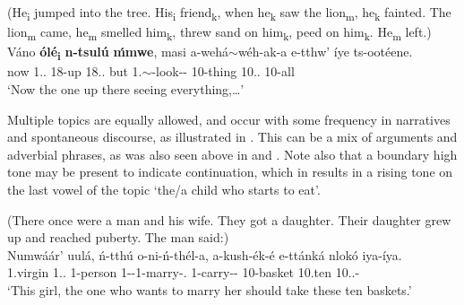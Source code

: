 \documentclass[output=paper]{langscibook}
\begin{document}
\z

\ea
\label{bkm:Ref129081312}
(He\textsubscript{i} jumped into the tree. His\textsubscript{i} friend\textsubscript{k}, when he\textsubscript{k} saw the lion\textsubscript{m}, he\textsubscript{k} fainted. The lion\textsubscript{m} came, he\textsubscript{m} smelled him\textsubscript{k}, threw sand on him\textsubscript{k}, peed on him\textsubscript{k}. He\textsubscript{m} left.)\\
\gll
Váno  \textbf{ólé\textsubscript{i}}  \textbf{n{}-tsulú}  \textbf{ḿmwe},  masi  a{}-wehá$\sim$wéh{}-ak{}-a  e-tthw’    íye  ts{}-ootéene.\\
now  1.\DEM{}.\DIST{}  18-up  18.\DEM{}.\DIST{}  but  1\SM{}.\SIT{}$\sim$\RED{}-look-\DUR{}-\FV{}  10-thing  10.\DEM{}.\DIST{}  10-all\\
\glt
‘Now the one up there seeing everything,…’

\z

Multiple topics are equally allowed, and occur with some frequency in narratives and spontaneous discourse, as illustrated in . This can be a mix of arguments and adverbial phrases, as was also seen above in  and . Note also that a boundary high tone may be present to indicate continuation, which in  results in a rising tone on the last vowel of the topic ‘the/a child who starts to eat’.

\ea
\label{bkm:Ref96973203}
(There once were a man and his wife. They got a daughter. Their daughter grew up and reached puberty. The man said:)\\
\gll
Numwáár’  uulá,  ń-tthú  o-ni-ń-thél-a,  a-kush-ék-é  e-ttánká  nlokó  iya-íya.\\
1.virgin  1.\DEM{}.\PROX{}  1-person  1{}-\PRS{}-1\OM{}-marry-\FV{}.\REL{}  1\SM{}-carry-\DUR{}-\SBJV{}  10-basket  10.ten  10.\DEM{}.\PROX{}-\RED{}\\
\glt
‘This girl, the one who wants to marry her should take these ten baskets.’ \citep[182]{vanderWal2009a}\\
\end{document}
